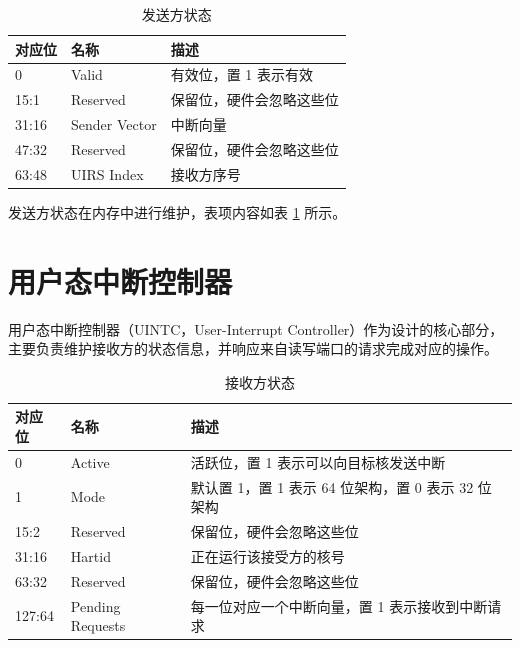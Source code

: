 \begin{table}
    \centering
    \begin{threeparttable}[c]
        \begin{tabular}{|l|l|l|}
            \hline
            对应位 & 名称 & 描述 \\
            \hline
            0 & Valid & 有效位，置 1 表示有效 \\
            \hline
            15:1 & Reserved & 保留位，硬件会忽略这些位 \\
            \hline
            31:16 & Sender Vector & 中断向量 \\
            \hline
            47:32 & Reserved & 保留位，硬件会忽略这些位 \\
            \hline
            63:48 & UIRS Index & 接收方序号 \\
            \hline
        \end{tabular}
        \caption{发送方状态}
        \label{tab:uiss}
    \end{threeparttable}
\end{table}

发送方状态在内存中进行维护，表项内容如表 \ref{tab:uiss} 所示。

\section{用户态中断控制器}

用户态中断控制器（UINTC，User-Interrupt Controller）作为设计的核心部分，主要负责维护接收方的状态信息，并响应来自读写端口的请求完成对应的操作。

\begin{table}
    \centering
    \begin{threeparttable}[c]
        \begin{tabular}{|l|l|l|}
            \hline
            对应位 & 名称 & 描述 \\
            \hline
            0 & Active & 活跃位，置 1 表示可以向目标核发送中断 \\
            \hline
            1 & Mode & 默认置 1，置 1 表示 64 位架构，置 0 表示 32 位架构 \\
            \hline
            15:2 & Reserved & 保留位，硬件会忽略这些位 \\
            \hline
            31:16 & Hartid & 正在运行该接受方的核号 \\
            \hline
            63:32 & Reserved & 保留位，硬件会忽略这些位 \\
            \hline
            127:64 & Pending Requests & 每一位对应一个中断向量，置 1 表示接收到中断请求 \\
            \hline
        \end{tabular}
        \caption{接收方状态}
        \label{tab:uirs}
    \end{threeparttable}
\end{table}

